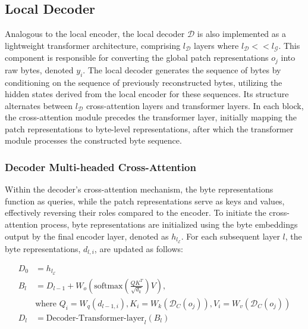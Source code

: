 \subsection{Local Decoder} 

Analogous to the local encoder, the local decoder $\mathcal{D}$ is also implemented as a lightweight transformer architecture, comprising $l_{\mathcal{D}}$ layers where $l_{\mathcal{D}} << l_{\mathcal{G}}$. This component is responsible for converting the global patch representations $o_j$ into raw bytes, denoted $y_i$. The local decoder generates the sequence of bytes by conditioning on the sequence of previously reconstructed bytes, utilizing the hidden states derived from the local encoder for these sequences. Its structure alternates between $l_{\mathcal{D}}$ cross-attention layers and transformer layers. In each block, the cross-attention module precedes the transformer layer, initially mapping the patch representations to byte-level representations, after which the transformer module processes the constructed byte sequence.

\subsubsection{Decoder Multi-headed Cross-Attention} 

Within the decoder’s cross-attention mechanism, the byte representations function as queries, while the patch representations serve as keys and values, effectively reversing their roles compared to the encoder. To initiate the cross-attention process, byte representations are initialized using the byte embeddings output by the final encoder layer, denoted as $h_{l_{\mathcal{E}}}$. For each subsequent layer $l$, the byte representations, $d_{l,i}$, are updated as follows:

\begin{align}
D_0 &= h_{l_{\mathcal{E}}} \\
B_l &= D_{l-1} + W_o\left(\text{softmax}\left(\frac{QK^T}{\sqrt{d_k}}\right)V\right), \\
  &\text{where } Q_i = W_q(d_{l-1,i}), K_i = W_k(\mathcal{D}_C(o_j)), V_i = W_v(\mathcal{D}_C(o_j)) \\
  D_l &= \text{Decoder-Transformer-layer}_l(B_l)
\end{align}

